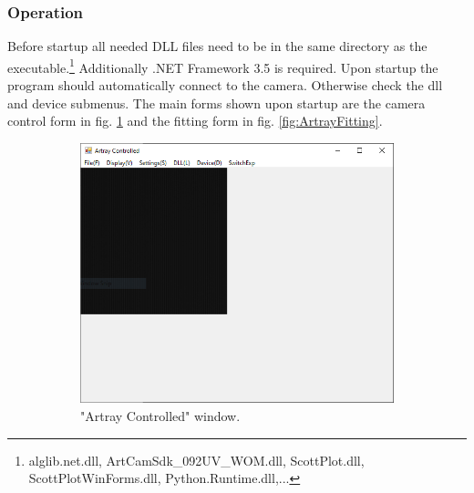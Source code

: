 \documentclass[twoside,openright,listof=numbered]{scrreprt}
\begin{document}
\subsubsection{Operation}
Before startup all needed DLL files need to be in the same directory as the executable.\footnote{alglib.net.dll, ArtCamSdk\_092UV\_WOM.dll, ScottPlot.dll, ScottPlotWinForms.dll, Python.Runtime.dll,...} Additionally .NET Framework 3.5 is required. Upon startup the program should automatically connect to the camera. Otherwise check the dll and device submenus.
The main forms shown upon startup are the camera control form in fig. \ref{fig:ArtrayMain} and the fitting form in fig. \ref{fig:ArtrayFitting}.

\begin{figure}[hbtp]
\centering
\begin{subfigure}[t]{0.49\linewidth}
\includegraphics[width = \columnwidth]{images/ArtrayExamplePics/ArtrayControlledMain.PNG}
\caption{"Artray Controlled" window.\label{fig:ArtrayMain}}
\end{subfigure}
\hfill
\begin{subfigure}[t]{0.49\linewidth}
\centering

\end{subfigure}
\end{figure}
\end{document}
